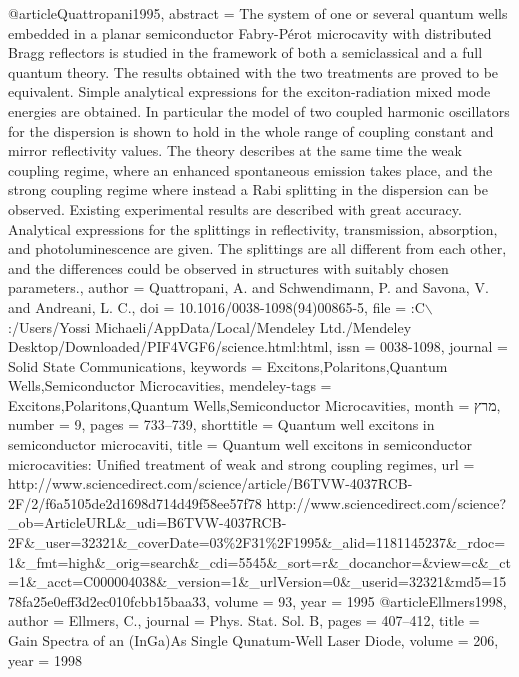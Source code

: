 @article{Quattropani1995,
abstract = {The system of one or several quantum wells embedded in a planar semiconductor Fabry-P\'{e}rot microcavity with distributed Bragg reflectors is studied in the framework of both a semiclassical and a full quantum theory. The results obtained with the two treatments are proved to be equivalent. Simple analytical expressions for the exciton-radiation mixed mode energies are obtained. In particular the model of two coupled harmonic oscillators for the dispersion is shown to hold in the whole range of coupling constant and mirror reflectivity values. The theory describes at the same time the weak coupling regime, where an enhanced spontaneous emission takes place, and the strong coupling regime where instead a Rabi splitting in the dispersion can be observed. Existing experimental results are described with great accuracy. Analytical expressions for the splittings in reflectivity, transmission, absorption, and photoluminescence are given. The splittings are all different from each other, and the differences could be observed in structures with suitably chosen parameters.},
author = {Quattropani, A. and Schwendimann, P. and Savona, V. and Andreani, L. C.},
doi = {10.1016/0038-1098(94)00865-5},
file = {:C$\backslash$:/Users/Yossi Michaeli/AppData/Local/Mendeley Ltd./Mendeley Desktop/Downloaded/PIF4VGF6/science.html:html},
issn = {0038-1098},
journal = {Solid State Communications},
keywords = {Excitons,Polaritons,Quantum Wells,Semiconductor Microcavities},
mendeley-tags = {Excitons,Polaritons,Quantum Wells,Semiconductor Microcavities},
month = {מרץ},
number = {9},
pages = {733--739},
shorttitle = {Quantum well excitons in semiconductor microcaviti},
title = {{Quantum well excitons in semiconductor microcavities: Unified treatment of weak and strong coupling regimes}},
url = {http://www.sciencedirect.com/science/article/B6TVW-4037RCB-2F/2/f6a5105de2d1698d714d49f58ee57f78 http://www.sciencedirect.com/science?\_ob=ArticleURL\&\_udi=B6TVW-4037RCB-2F\&\_user=32321\&\_coverDate=03\%2F31\%2F1995\&\_alid=1181145237\&\_rdoc=1\&\_fmt=high\&\_orig=search\&\_cdi=5545\&\_sort=r\&\_docanchor=\&view=c\&\_ct=1\&\_acct=C000004038\&\_version=1\&\_urlVersion=0\&\_userid=32321\&md5=1578fa25e0eff3d2ec010fcbb15baa33},
volume = {93},
year = {1995}
}
@article{Ellmers1998,
author = {Ellmers, C.},
journal = {Phys. Stat. Sol. B},
pages = {407--412},
title = {{Gain Spectra of an (InGa)As Single Qunatum-Well Laser Diode}},
volume = {206},
year = {1998}
}
